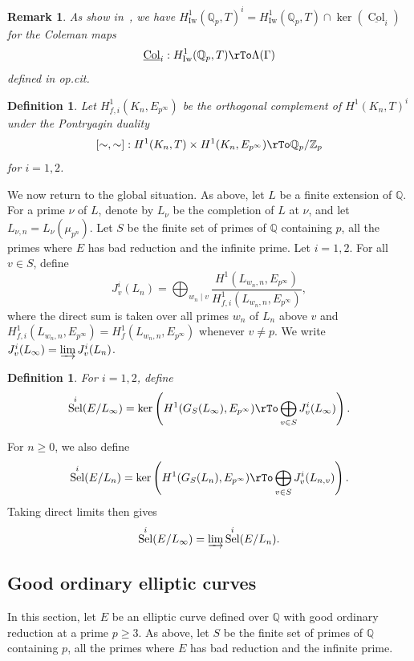 \documentclass{amsart}
\newcommand{\QQ}{\mathbb Q}
\newcommand{\ZZ}{\mathbb Z}
\DeclareMathOperator{\Sel}{Sel}
\DeclareMathOperator{\Iw}{Iw}
\DeclareMathOperator{\Col}{Col}
\newcommand{\Ep}{E_{p^\infty}}
\newcommand{\Qp}{\QQ_p}
\newcommand{\Zp}{\ZZ_p}
\newtheorem{remark}[theorem]{Remark}
\newtheorem{definition}[theorem]{Definition}
\begin{document}
  \begin{remark}\label{relationtoColeman}
   As show in~\cite[\S 5.2.1]{leiloefflerzerbes10}, we have $H^1_{\Iw}(\Qp,T)^i=H^1_{\Iw}(\Qp,T)\cap\ker(\underline{\Col}_i)$ for the Coleman maps
   \[ \underline{\Col}_i: H^1_{\Iw}(\Qp,T)\rTo\Lambda(\Gamma)\]
   defined in {\em op.cit.}
  \end{remark}

  
  \begin{definition}
   Let $H^1_{f,i}(K_n,\Ep)$ be the orthogonal complement of $H^1(K_n,T)^i$ under the Pontryagin duality
   \[ [\sim,\sim]: H^1(K_n,T)\times H^1(K_n,\Ep)\rTo \Qp\slash\Zp\]
   for $i=1,2$.
  \end{definition}

  
  We now return to the global situation. As above, let $L$ be a finite extension of $\QQ$. For a prime $\nu$ of $L$, denote by $L_\nu$ be the completion of $L$ at $\nu$, and let $L_{\nu,n}=L_\nu(\mu_{p^n})$. Let $S$ be the finite set of primes of $\QQ$ containing $p$, all the primes where $E$ has bad reduction and the infinite prime. Let $i=1,2$. For all $v\in S$, define 
   \[ J^i_v(L_n)= \bigoplus_{w_n\mid v}  \frac{H^1(L_{w_n,n},\Ep)}{H^1_{f,i}(L_{w_n,n},\Ep)},\] 
   where the direct sum is taken over all primes $w_n$ of $L_n$ above $v$ and $H^1_{f,i}(L_{w_n,n},\Ep)=H^1_f(L_{w_n,n},\Ep)$ whenever $v\neq p$. We write $J^i_v(L_\infty)=\varinjlim J^i_v(L_n)$.  
  
   \begin{definition}
    For $i=1,2$, define 
    \[ \Sel^i(E\slash L_\infty)=\ker\left( H^1(G_S(L_\infty),\Ep)\rTo \bigoplus_{v\in S}J^i_v(L_\infty)\right).\] 
   \end{definition}
  
   For $n\geq 0$, we also define
    \[ \Sel^i(E\slash L_n)=\ker\left( H^1(G_S(L_n),\Ep)\rTo \bigoplus_{v\in S}J^i_v(L_{n,v})\right).\] 
   Taking direct limits then gives
    \[\Sel^i(E\slash L_\infty)=\varinjlim \Sel^i(E\slash L_n).\]
  


  \subsection{Good ordinary elliptic curves}\label{ordinary}
  
   In this section, let $E$ be an elliptic curve defined over $\QQ$ with good ordinary reduction at a prime $p\geq 3$. As above, let $S$ be the finite set of primes of $\QQ$ containing $p$, all the primes where $E$ has bad reduction and the infinite prime. 
\end{document}
